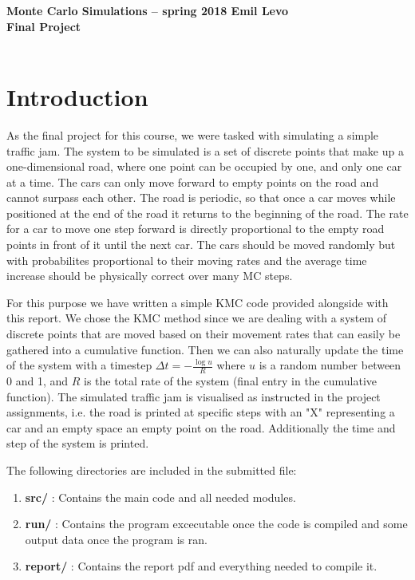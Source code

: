 \documentclass[a4paper,12pt]{article}
\begin{document}
{\bf Monte Carlo Simulations -- spring 2018 \hfill Emil Levo\\ Final Project}\\
\\

\section{Introduction}

As the final project for this course, we were tasked with simulating a simple traffic jam. The system to be simulated is a set of discrete points that make up a one-dimensional road, where one point can be occupied by one, and only one car at a time. The cars can only move forward to empty points on the road and cannot surpass each other. The road is periodic, so that once a car moves while positioned at the end of the road it returns to the beginning of the road. The rate for a car to move one step forward is directly proportional to the empty road points in front of it until the next car. The cars should be moved randomly but with probabilites proportional to their moving rates and the average time increase should be physically correct over many MC steps.

For this purpose we have written a simple KMC code provided alongside with this report. We chose the KMC method since we are dealing with a system of discrete points that are moved based on their movement rates that can easily be gathered into a cumulative function. Then we can also naturally update the time of the system with a timestep $\Delta t = -\frac{\log u}{R} $ where $u$ is a random number between 0 and 1, and $R$ is the total rate of the system (final entry in the cumulative function). The simulated traffic jam is visualised as instructed in the project assignments, i.e. the road is printed at specific steps with an "X" representing a car and an empty space an empty point on the road. Additionally the time and step of the system is printed.

The following directories are included in the submitted file:

\begin{enumerate}
\item {\bf{src/}} : Contains the main code and all needed modules.
\item {\bf{run/}} : Contains the program excecutable once the code is compiled and some output data once the program is ran.
\item {\bf{report/}} : Contains the report pdf and everything needed to compile it.
\end{enumerate} 
\end{document}
